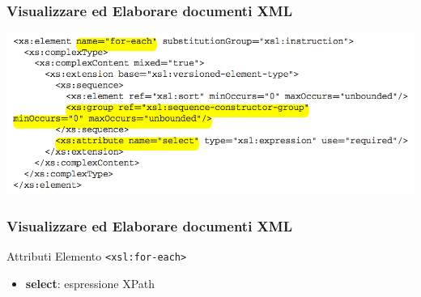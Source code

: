 \begin{frame}
    \frametitle{Visualizzare ed Elaborare documenti XML}
    \addtocounter{nframe}{1}
    
    \begin{center}
        \includegraphics[width=.95\textwidth]{imgs/Schema-for-each.png}
    \end{center}

\end{frame}

\begin{frame}
    \frametitle{Visualizzare ed Elaborare documenti XML}
    \addtocounter{nframe}{1}
    

     \begin{block}{Attributi Elemento \texttt{<xsl:for-each>}}
         \begin{itemize}
             \item \textbf{select}: espressione XPath
        \end{itemize}
     \end{block}
    
\end{frame}

